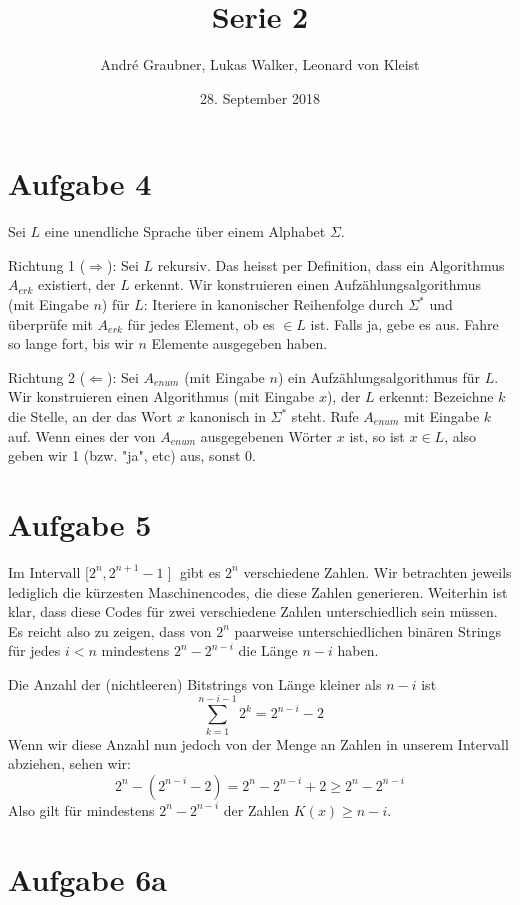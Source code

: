 \documentclass[a4paper]{article}
\title{Serie 2}
\author{André Graubner, Lukas Walker, Leonard von Kleist}
\date{28. September 2018}
\begin{document}
 

\maketitle

\section{Aufgabe 4}
	
	Sei $L$ eine unendliche Sprache über einem Alphabet $\Sigma$.
	
	Richtung 1 ($\Rightarrow$):
	Sei $L$ rekursiv.
	Das heisst per Definition, dass ein Algorithmus $A_{erk}$ existiert, der $L$ erkennt.
	Wir konstruieren einen Aufzählungsalgorithmus (mit Eingabe $n$) für $L$:
	Iteriere in kanonischer Reihenfolge durch $\Sigma^*$ und überprüfe mit $A_{erk}$ für 
	jedes Element, ob es $\in L$ ist. Falls ja, gebe es aus. Fahre so lange fort, bis wir
	$n$ Elemente ausgegeben haben.

	Richtung 2 ($\Leftarrow$):
	Sei $A_{enum}$ (mit Eingabe $n$) ein Aufzählungsalgorithmus für $L$.
	Wir konstruieren einen Algorithmus (mit Eingabe $x$), der $L$ erkennt:
	Bezeichne $k$ die Stelle, an der das Wort $x$ kanonisch in $\Sigma^*$ steht.
	Rufe $A_{enum}$ mit Eingabe $k$ auf. Wenn eines der von $A_{enum}$ ausgegebenen
	Wörter $x$ ist, so ist $x \in L$, also geben wir 1 (bzw. "ja", etc) aus, sonst 0.

\section{Aufgabe 5}

	Im Intervall $\mathopen[2^n, 2^{n+1}-1 \mathopen]$ gibt es $2^n$ verschiedene Zahlen.
	Wir betrachten jeweils lediglich die kürzesten Maschinencodes, die diese Zahlen generieren.
	Weiterhin ist klar, dass diese Codes für zwei verschiedene Zahlen unterschiedlich sein müssen. 
	Es reicht also zu zeigen, dass von $2^n$ paarweise unterschiedlichen binären Strings
	für jedes $i < n$ mindestens $2^n - 2^{n-i}$ die Länge $n - i$ haben.

	Die Anzahl der (nichtleeren) Bitstrings von Länge kleiner als $n - i$ ist 
	\[\sum_{k=1}^{n-i-1} 2^k = 2^{n-i} - 2\]
	Wenn wir diese Anzahl nun jedoch von der Menge an Zahlen in unserem Intervall abziehen, sehen wir:
	\[2^n - (2^{n-i} - 2) = 2^n - 2^{n-i} + 2 \geq 2^n - 2^{n-i}\]
	Also gilt für mindestens $2^n - 2^{n-i}$ der Zahlen $K(x) \geq n-i$.

\section{Aufgabe 6a}
\end{document}
